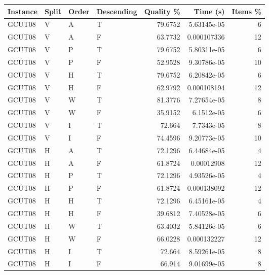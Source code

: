 \begin{tabular}{llllrrr}
    \hline
    Instance & Split & Order & Descending & Quality \% & Time (s)    & Items \% \\
    \hline
    GCUT08   & V     & A     & T          & 79.6752    & 5.63145e-05 & 6        \\
    GCUT08   & V     & A     & F          & 63.7732    & 0.000107336 & 12       \\
    GCUT08   & V     & P     & T          & 79.6752    & 5.80311e-05 & 6        \\
    GCUT08   & V     & P     & F          & 52.9528    & 9.30786e-05 & 10       \\
    GCUT08   & V     & H     & T          & 79.6752    & 6.20842e-05 & 6        \\
    GCUT08   & V     & H     & F          & 62.9792    & 0.000108194 & 12       \\
    GCUT08   & V     & W     & T          & 81.3776    & 7.27654e-05 & 8        \\
    GCUT08   & V     & W     & F          & 35.9152    & 6.1512e-05  & 6        \\
    GCUT08   & V     & I     & T          & 72.664     & 7.7343e-05  & 8        \\
    GCUT08   & V     & I     & F          & 74.4596    & 9.20773e-05 & 10       \\
    GCUT08   & H     & A     & T          & 72.1296    & 6.44684e-05 & 4        \\
    GCUT08   & H     & A     & F          & 61.8724    & 0.00012908  & 12       \\
    GCUT08   & H     & P     & T          & 72.1296    & 4.93526e-05 & 4        \\
    GCUT08   & H     & P     & F          & 61.8724    & 0.000138092 & 12       \\
    GCUT08   & H     & H     & T          & 72.1296    & 6.45161e-05 & 4        \\
    GCUT08   & H     & H     & F          & 39.6812    & 7.40528e-05 & 6        \\
    GCUT08   & H     & W     & T          & 63.4032    & 5.84126e-05 & 6        \\
    GCUT08   & H     & W     & F          & 66.0228    & 0.000132227 & 12       \\
    GCUT08   & H     & I     & T          & 72.664     & 8.59261e-05 & 8        \\
    GCUT08   & H     & I     & F          & 66.914     & 9.01699e-05 & 8        \\

\end{tabular}
